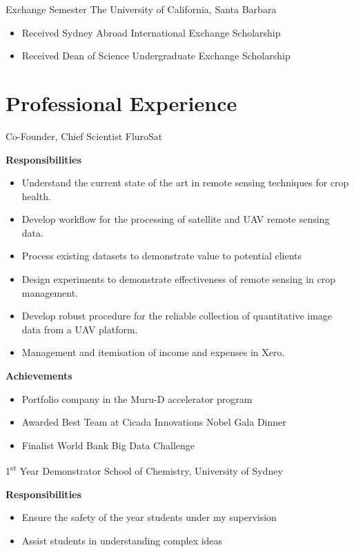{Exchange Semester}
{The University of California, Santa Barbara}{}{}
{%
\begin{itemize}
  \item Received Sydney Abroad International Exchange Scholarship
  \item Received Dean of Science Undergraduate Exchange Scholarship
\end{itemize}
}

\nocite{*}
\printbibliography[title={Publications}]

\pagebreak
\section{Professional Experience}

{Co-Founder, Chief Scientist}
{FluroSat}{}{}
{%
\textbf{Responsibilities}
  \begin{itemize}
    \item Understand the current state of the art in remote sensing techniques for crop health.
    \item Develop workflow for the processing of satellite and UAV remote sensing data.
    \item Process existing datasets to demonstrate value to potential clients
    \item Design experiments to demonstrate effectiveness of remote sensing in crop management.
    \item Develop robust procedure for the reliable collection of quantitative image data from a UAV platform.
    \item Management and itemisation of income and expenses in Xero.
  \end{itemize}
  \textbf{Achievements}
  \begin{itemize}
    \item Portfolio company in the Muru-D accelerator program
    \item Awarded Best Team at Cicada Innovations Nobel Gala Dinner
    \item Finalist World Bank Big Data Challenge
  \end{itemize}
}

{1\textsuperscript{st} Year Demonstrator}
{School of Chemistry, University of Sydney}
{}{}
{%
\textbf{Responsibilities}
    \begin{itemize}
      \item Ensure the safety of the  year students under my supervision
        \item Assist students in understanding complex ideas
    \end{itemize}
}

